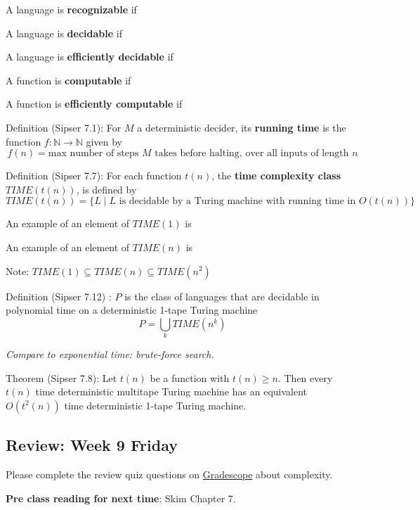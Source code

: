 \documentclass[12pt, oneside]{article}
\begin{document}
A language is {\bf recognizable} if \underline{\phantom{\hspace{4.5in}}}

A language is {\bf decidable} if \underline{\phantom{\hspace{4.7in}}}

A language is {\bf efficiently  decidable} if \underline{\phantom{\hspace{4in}}}

A function is {\bf computable} if \underline{\phantom{\hspace{4.7in}}}

A function is {\bf efficiently computable} if \underline{\phantom{\hspace{4in}}}\\

\vfill

Definition  (Sipser 7.1): For  $M$ a deterministic decider, its {\bf running time} is the function  $f: \mathbb{N} \to \mathbb{N}$
given  by
\[
f(n) =  \text{max number of  steps $M$ takes before halting, over all inputs  of length $n$}
\]

Definition (Sipser 7.7): For each function $t(n)$, the {\bf time complexity class}  $TIME(t(n))$, is defined  by
\[
TIME( t(n)) = \{ L \mid \text{$L$ is decidable by  a Turing machine with running time in  $O(t(n))$} \}
\]

An example of an element of  $TIME(  1  )$ is 

An example of an element of  $TIME(  n  )$ is 


Note: $TIME( 1) \subseteq TIME (n)  \subseteq TIME(n^2)$

\vfill

Definition (Sipser 7.12) : $P$ is the class of languages that  are decidable in polynomial time on 
a deterministic 1-tape  Turing  machine
\[
P  =  \bigcup_k TIME(n^k)
\]

{\it Compare to exponential time: brute-force search.}


Theorem (Sipser 7.8): Let $t(n)$ be a  function with  $t(n)  \geq n$.  Then every $t(n)$ time deterministic 
multitape Turing machine has an equivalent $O(t^2(n))$ time deterministic 1-tape Turing machine.

\newpage 
\newpage
\subsection*{Review: Week 9 Friday}


Please complete the review quiz questions on \href{http://gradescope.com}{Gradescope} about 
complexity.

{\bf Pre class reading for next time}: Skim Chapter 7.
\end{document}

